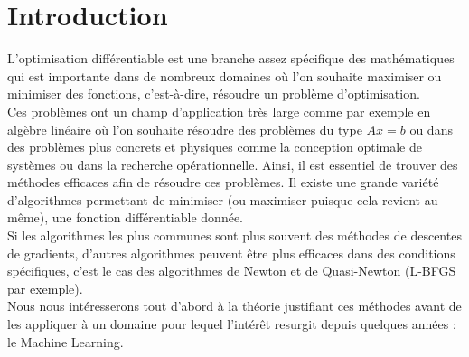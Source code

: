 \chapter{Introduction}
L'optimisation différentiable est une branche assez spécifique des mathématiques qui est importante dans de nombreux domaines où l'on souhaite maximiser ou minimiser des fonctions, c'est-à-dire, résoudre un problème d'optimisation.\\

 Ces problèmes ont un champ d'application très large comme par exemple en algèbre linéaire où l'on souhaite résoudre des problèmes du type $Ax=b$ ou dans des problèmes plus concrets et physiques comme la conception optimale de systèmes ou dans la recherche opérationnelle. Ainsi, il est essentiel de trouver des méthodes efficaces afin de résoudre ces problèmes. Il existe une grande variété d'algorithmes permettant de minimiser (ou maximiser puisque cela revient au même), une fonction différentiable donnée.\\

 Si les algorithmes les plus communes sont plus souvent des méthodes de descentes de gradients, d'autres algorithmes peuvent être plus efficaces dans des conditions spécifiques, c'est le cas des algorithmes de Newton et de Quasi-Newton (L-BFGS par exemple).\\



Nous nous intéresserons tout d'abord à la théorie justifiant ces méthodes avant de les appliquer à un domaine pour lequel l'intérêt resurgit depuis quelques années : le Machine Learning.

